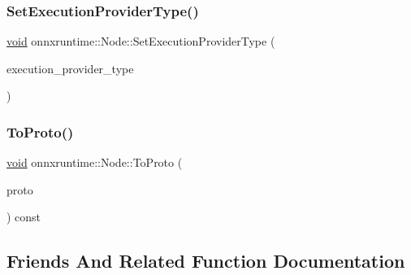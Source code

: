 \mbox{\label{classonnxruntime_1_1Node_ab323d8e3bd4d5595730bcd6eb9fab760}} 
\subsubsection{\texorpdfstring{Set\+Execution\+Provider\+Type()}{SetExecutionProviderType()}}
{\footnotesize\ttfamily \mbox{\hyperlink{mlasi_8h_a88f941d423cb2a819b70a1358982b1a6}{void}} onnxruntime\+::\+Node\+::\+Set\+Execution\+Provider\+Type (\begin{DoxyParamCaption}\item[{\mbox{\hyperlink{namespaceonnxruntime_a863e2227cbf32aab76aad35fdadff4bb}{onnxruntime\+::\+Provider\+Type}}}]{execution\+\_\+provider\+\_\+type }\end{DoxyParamCaption})}

\mbox{\label{classonnxruntime_1_1Node_ab7674297b124b064d0bee3fc56d1e29c}} 
\subsubsection{\texorpdfstring{To\+Proto()}{ToProto()}}
{\footnotesize\ttfamily \mbox{\hyperlink{mlasi_8h_a88f941d423cb2a819b70a1358982b1a6}{void}} onnxruntime\+::\+Node\+::\+To\+Proto (\begin{DoxyParamCaption}\item[{O\+N\+N\+X\+\_\+\+N\+A\+M\+E\+S\+P\+A\+C\+E\+::\+Node\+Proto \&}]{proto }\end{DoxyParamCaption}) const}



\subsection{Friends And Related Function Documentation}
\mbox{\label{classonnxruntime_1_1Node_afab89afd724f1b07b1aaad6bdc61c47a}} 

